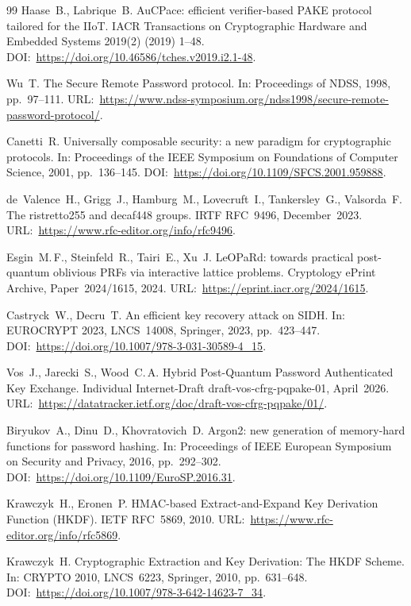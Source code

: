 \documentclass[preprint,12pt]{elsarticle}
\theoremstyle{remark}
\begin{document}
\begin{thebibliography}{99}
Haase~B., Labrique~B.
AuCPace: efficient verifier-based PAKE protocol tailored for the IIoT.
IACR Transactions on Cryptographic Hardware and Embedded Systems 2019(2) (2019) 1--48.
DOI:~\url{https://doi.org/10.46586/tches.v2019.i2.1-48}.

Wu~T.
The Secure Remote Password protocol.
In: Proceedings of NDSS, 1998, pp.~97--111.
URL:~\url{https://www.ndss-symposium.org/ndss1998/secure-remote-password-protocol/}.

Canetti~R.
Universally composable security: a new paradigm for cryptographic protocols.
In: Proceedings of the IEEE Symposium on Foundations of Computer Science, 2001, pp.~136--145.
DOI:~\url{https://doi.org/10.1109/SFCS.2001.959888}.

de~Valence~H., Grigg~J., Hamburg~M., Lovecruft~I., Tankersley~G.,
Valsorda~F.
The ristretto255 and decaf448 groups.
IRTF RFC~9496, December~2023.
URL:~\url{https://www.rfc-editor.org/info/rfc9496}.

Esgin~M.\,F., Steinfeld~R., Tairi~E., Xu~J.
LeOPaRd: towards practical post-quantum oblivious PRFs via interactive lattice problems.
Cryptology ePrint Archive, Paper~2024/1615, 2024.
URL:~\url{https://eprint.iacr.org/2024/1615}.

Castryck~W., Decru~T.
An efficient key recovery attack on SIDH.
In: EUROCRYPT 2023, LNCS~14008, Springer, 2023, pp.~423--447.
DOI:~\url{https://doi.org/10.1007/978-3-031-30589-4_15}.

Vos~J., Jarecki~S., Wood~C.\,A.
Hybrid Post-Quantum Password Authenticated Key Exchange.
Individual Internet-Draft draft-vos-cfrg-pqpake-01, April~2026.
URL:~\url{https://datatracker.ietf.org/doc/draft-vos-cfrg-pqpake/01/}.

Biryukov~A., Dinu~D., Khovratovich~D.
Argon2: new generation of memory-hard functions for password hashing.
In: Proceedings of IEEE European Symposium on Security and Privacy, 2016, pp.~292--302.
DOI:~\url{https://doi.org/10.1109/EuroSP.2016.31}.

Krawczyk~H., Eronen~P.
HMAC-based Extract-and-Expand Key Derivation Function (HKDF).
IETF RFC~5869, 2010.
URL:~\url{https://www.rfc-editor.org/info/rfc5869}.

Krawczyk~H.
Cryptographic Extraction and Key Derivation: The HKDF Scheme.
In: CRYPTO 2010, LNCS~6223, Springer, 2010, pp.~631--648.
DOI:~\url{https://doi.org/10.1007/978-3-642-14623-7_34}.


\end{thebibliography}
\end{document}
